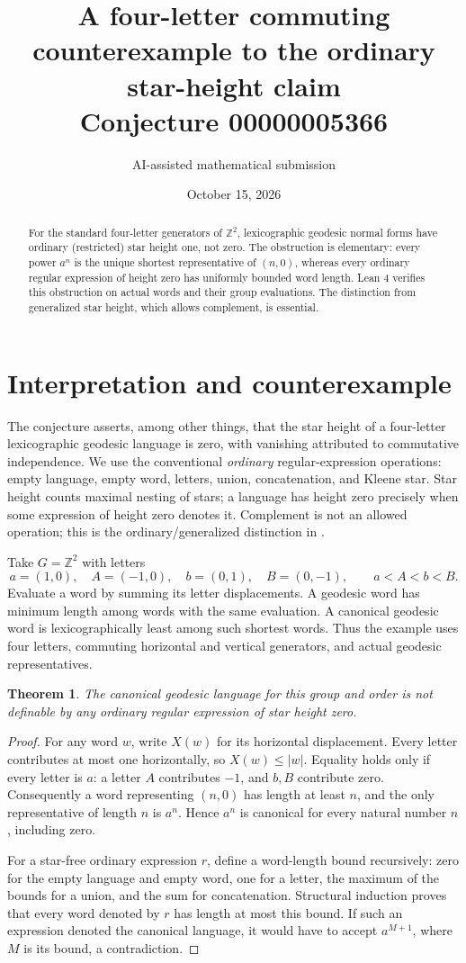\documentclass[11pt]{article}
\title{A four-letter commuting counterexample to the ordinary star-height claim\\Conjecture 00000005366}
\author{AI-assisted mathematical submission}
\date{October 15, 2026}
\newtheorem{theorem}{Theorem}
\begin{document}
\maketitle
\begin{abstract}
For the standard four-letter generators of $\mathbb Z^2$, lexicographic geodesic normal forms have ordinary (restricted) star height one, not zero. The obstruction is elementary: every power $a^n$ is the unique shortest representative of $(n,0)$, whereas every ordinary regular expression of height zero has uniformly bounded word length. Lean 4 verifies this obstruction on actual words and their group evaluations. The distinction from generalized star height, which allows complement, is essential.
\end{abstract}

\section{Interpretation and counterexample}
The conjecture asserts, among other things, that the star height of a four-letter lexicographic geodesic language is zero, with vanishing attributed to commutative independence. We use the conventional \emph{ordinary} regular-expression operations: empty language, empty word, letters, union, concatenation, and Kleene star. Star height counts maximal nesting of stars; a language has height zero precisely when some expression of height zero denotes it. Complement is not an allowed operation; this is the ordinary/generalized distinction in \cite{place}.

Take $G=\mathbb Z^2$ with letters
\[
 a=(1,0),\quad A=(-1,0),\quad b=(0,1),\quad B=(0,-1),
 \qquad a<A<b<B.
\]
Evaluate a word by summing its letter displacements. A geodesic word has minimum length among words with the same evaluation. A canonical geodesic word is lexicographically least among such shortest words. Thus the example uses four letters, commuting horizontal and vertical generators, and actual geodesic representatives.

\begin{theorem}
The canonical geodesic language for this group and order is not definable by any ordinary regular expression of star height zero.
\end{theorem}
\begin{proof}
For any word $w$, write $X(w)$ for its horizontal displacement. Every letter contributes at most one horizontally, so $X(w)\leq |w|$. Equality holds only if every letter is $a$: a letter $A$ contributes $-1$, and $b,B$ contribute zero. Consequently a word representing $(n,0)$ has length at least $n$, and the only representative of length $n$ is $a^n$. Hence $a^n$ is canonical for every natural number $n$, including zero.

For a star-free ordinary expression $r$, define a word-length bound recursively: zero for the empty language and empty word, one for a letter, the maximum of the bounds for a union, and the sum for concatenation. Structural induction proves that every word denoted by $r$ has length at most this bound. If such an expression denoted the canonical language, it would have to accept $a^{M+1}$, where $M$ is its bound, a contradiction.
\end{proof}
\end{document}
